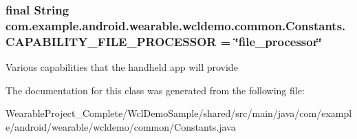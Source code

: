 \subsubsection[{\texorpdfstring{C\+A\+P\+A\+B\+I\+L\+I\+T\+Y\+\_\+\+F\+I\+L\+E\+\_\+\+P\+R\+O\+C\+E\+S\+S\+OR}{CAPABILITY_FILE_PROCESSOR}}]{\setlength{\rightskip}{0pt plus 5cm}final String com.\+example.\+android.\+wearable.\+wcldemo.\+common.\+Constants.\+C\+A\+P\+A\+B\+I\+L\+I\+T\+Y\+\_\+\+F\+I\+L\+E\+\_\+\+P\+R\+O\+C\+E\+S\+S\+OR = \char`\"{}file\+\_\+processor\char`\"{}\hspace{0.3cm}{\ttfamily [static]}}\hypertarget{classcom_1_1example_1_1android_1_1wearable_1_1wcldemo_1_1common_1_1Constants_a011c24d2958f3b1f5cc199e6f7849591}{}\label{classcom_1_1example_1_1android_1_1wearable_1_1wcldemo_1_1common_1_1Constants_a011c24d2958f3b1f5cc199e6f7849591}
Various capabilities that the handheld app will provide 

The documentation for this class was generated from the following file\+:\begin{DoxyCompactItemize}
\item 
Wearable\+Project\+\_\+\+Complete/\+Wcl\+Demo\+Sample/shared/src/main/java/com/example/android/wearable/wcldemo/common/Constants.\+java\end{DoxyCompactItemize}

